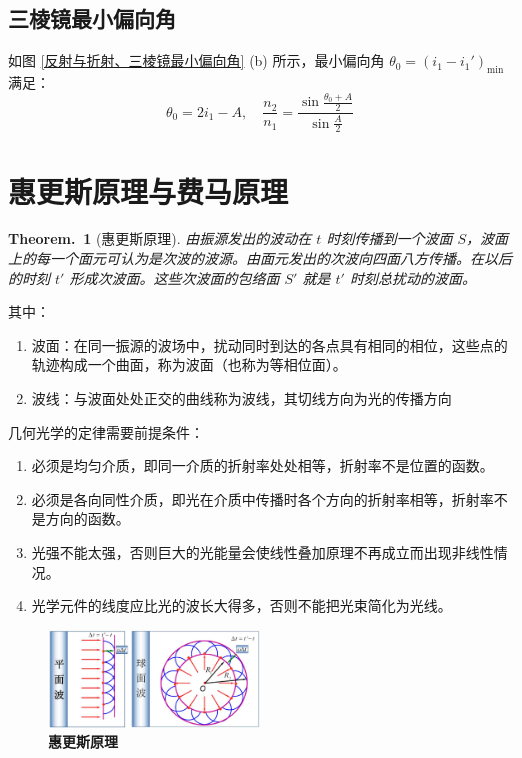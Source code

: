 \documentclass[UTF8]{report}
\theoremstyle{MyLineTheoremStyle} %
\newtheorem{LineTheorem}{Theorem.\,}
\theoremstyle{MyBlockTheoremStyle} %
\theoremstyle{MySubsubsectionStyle} %
\begin{document}
\subsection{三棱镜最小偏向角}

如图 \ref{反射与折射、三棱镜最小偏向角} (b) 所示，最小偏向角 $\theta_0 = (i_1 - i_1')_{\text{min}}$ 满足：
\begin{equation}
    \theta_0 = 2i_1 - A, \quad \frac{n_2}{n_1} = \frac{\sin\frac{\theta_0+A}2}{\sin\frac A2}
\end{equation}



\section{惠更斯原理与费马原理}

\begin{LineTheorem}[惠更斯原理]\label{LineTheorem: 惠更斯原理}
    由振源发出的波动在 $t$ 时刻传播到一个波面 $S$，波面上的每一个面元可认为是次波的波源。由面元发出的次波向四面八方传播。在以后的时刻 $t'$ 形成次波面。这些次波面的包络面 $S'$ 就是 $t'$ 时刻总扰动的波面。
\end{LineTheorem}

\noindent 其中：
\begin{enumerate}
    \item 波面：在同一振源的波场中，扰动同时到达的各点具有相同的相位，这些点的轨迹构成一个曲面，称为波面（也称为等相位面）。
    \item 波线：与波面处处正交的曲线称为波线，其切线方向为光的传播方向
\end{enumerate}

\noindent 几何光学的定律需要前提条件：
\begin{enumerate}
\item 必须是均匀介质，即同一介质的折射率处处相等，折射率不是位置的函数。
\item 必须是各向同性介质，即光在介质中传播时各个方向的折射率相等，折射率不是方向的函数。
\item 光强不能太强，否则巨大的光能量会使线性叠加原理不再成立而出现非线性情况。
\item 光学元件的线度应比光的波长大得多，否则不能把光束简化为光线。
\end{enumerate}

\begin{figure}[H]\centering
\includegraphics[width=0.5\textwidth]{assets/1,2/image (46).jpg}
\caption{\textbf{惠更斯原理}}\label{惠更斯原理}
\end{figure}
\end{document}
